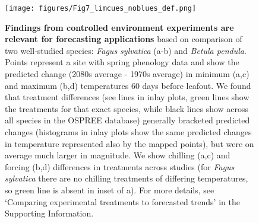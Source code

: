 \documentclass[11pt,letter]{article}
\begin{document}
\clearpage

\begin{figure}[t!]
\centering
\texttt{[image: figures/Fig7\_limcues\_noblues\_def.png]}
\caption{{\bf Findings from controlled environment experiments are relevant for forecasting applications} based on comparison of two well-studied species: \emph{Fagus sylvatica} (a-b) and \emph{Betula pendula}. Points represent a site with spring phenology data  \citep[from the PEP725 database,][]{Templ2018} and show the predicted change (2080s average - 1970s average) in minimum (a,c) and maximum (b,d) temperatures 60 days before leafout. We found that treatment differences (see lines in inlay plots, green lines show the treatments for that exact species, while black lines show across all species in the OSPREE database) generally bracketed predicted changes (histograms in inlay plots show the same predicted changes in temperature represented also by the mapped points), but were on average much larger in magnitude. We show chilling (a,c) and forcing (b,d) differences in treatments across studies (for \emph{Fagus sylvatica} there are no chilling treatments of differing temperatures, so green line is absent in inset of a). For more details, see `Comparing experimental treatments to forecasted trends' in the Supporting Information.}
\label{fig:pep} %
\end{figure}
\end{document}
